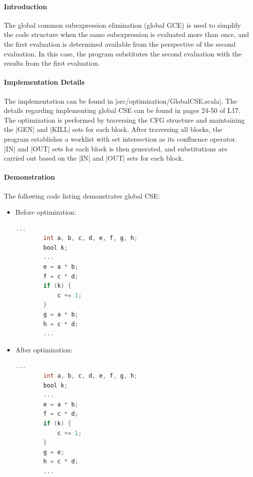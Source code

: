 \paragraph{Introduction}

The global common subexpression elimination (global GCE) is used to simplify the code structure when the same subexpression is evaluated more than once, and the first evaluation is determined available from the perspective of the second evaluation. In this case, the program substitutes the second evaluation with the results from the first evaluation.

\paragraph{Implementation Details}

The implementation can be found in |src/optimization/GlobalCSE.scala|. The details regarding implementing global CSE can be found in pages 24-50 of L17. The optimization is performed by traversing the CFG structure and maintaining the |GEN| and |KILL| sets for each block. After traversing all blocks, the program establishes a worklist with set intersection as its confluence operator. |IN| and |OUT| sets for each block is then generated, and substitutions are carried out based on the |IN| and |OUT| sets for each block.

\paragraph{Demonstration}

The following code listing demonstrates global CSE:

\begin{itemize}
    \item Before optimization:
    \begin{lstlisting}[language=C]
        ...
        int a, b, c, d, e, f, g, h;
        bool k;
        ...
        e = a * b;
        f = c * d;
        if (k) {
            c += 1;
        }
        g = a * b;
        h = c * d;
        ...
    \end{lstlisting}
    \item After optimization:
    \begin{lstlisting}[language=C]
        ...
        int a, b, c, d, e, f, g, h;
        bool k;
        ...
        e = a * b;
        f = c * d;
        if (k) {
            c += 1;
        }
        g = e;
        h = c * d;
        ...
    \end{lstlisting}
\end{itemize}


